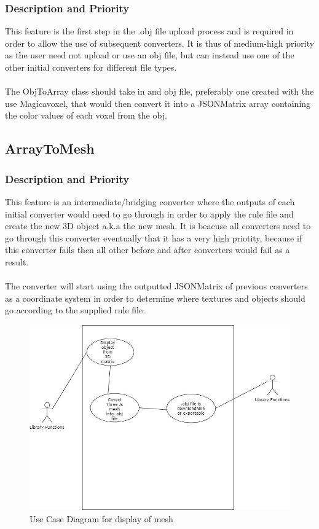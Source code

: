 \documentclass[english]{article}
\begin{document}
		\subsubsection{Description and Priority}
			This feature is the first step in the .obj file upload process and is required in order to allow the use of subsequent converters. It is thus of medium-high priority as the user need not upload or use an obj file, but can instead use one of the other initial converters for different file types.\\\\
			The ObjToArray class should take in and obj file, preferably one created with the use Magicavoxel, that would then convert it into a JSONMatrix array containing the color values of each voxel from the obj.
			
	\pagebreak
		\subsection{ArrayToMesh}
		\subsubsection{Description and Priority}
		This feature is an intermediate/bridging converter where the outputs of each initial converter would need to go through in order to apply the rule file and create the new 3D object a.k.a the new mesh. It is beacuse all converters need to go through this converter eventually that it has a very high priotity, because if this converter fails then all other before and after converters would fail as a result.\\\\
		The converter will start using the outputted JSONMatrix of previous converters as a coordinate system in order to determine where textures and objects should go according to the supplied rule file. 
		
		\begin{figure}[h]
			\includegraphics[width=\textwidth]{Use Cases/DisplayAndSave.jpg}
			\caption{Use Case Diagram for display of mesh }
		\end{figure}
		
\end{document}
